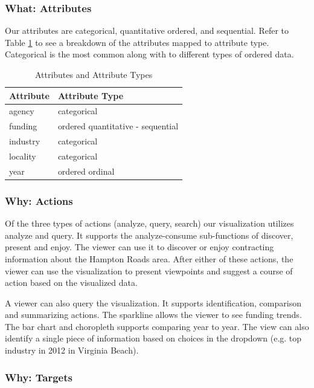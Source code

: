 \documentclass[10pt,journal,compsoc]{IEEEtran}
\begin{document}
\subsubsection{What: Attributes}

Our attributes are categorical, quantitative ordered, and sequential. Refer to Table \ref{tab:attribute-type} to see a breakdown of the attributes mapped to attribute type. Categorical is the most common along with to different types of ordered data.

\begin{table}[t]
\centering
\begin{tabular}{l | l}
\textbf{Attribute} & \textbf{Attribute Type} \\
\hline
agency & categorical\\
\hline
funding & ordered quantitative - sequential \\
\hline
industry & categorical \\
\hline
locality & categorical \\
\hline
year & ordered ordinal \\

\hline
\end{tabular}

\caption{Attributes and Attribute Types}
\label{tab:attribute-type}

\end{table} 

\subsubsection{Why: Actions}

Of the three types of actions (analyze, query, search) our visualization utilizes analyze and query. It supports the analyze-consume sub-functions of discover, present and enjoy. The viewer can use it to discover or enjoy contracting information about the Hampton Roads area. After either of these actions, the viewer can use the visualization to present viewpoints and suggest a course of action based on the visualized data.

A viewer can also query the visualization. It supports identification, comparison and summarizing actions. The sparkline allows the viewer to see funding trends. The bar chart and choropleth supports comparing year to year. The view can also identify a single piece of information based on choices in the dropdown (e.g. top industry in 2012 in Virginia Beach).

\subsubsection{Why: Targets}
\end{document}
